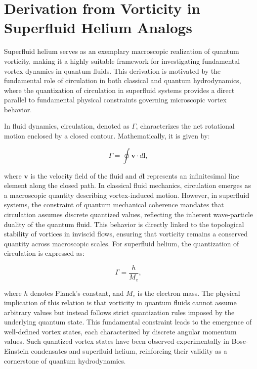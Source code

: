 \section*{Derivation from Vorticity in Superfluid Helium Analogs}

Superfluid helium serves as an exemplary macroscopic realization of quantum vorticity, making it a highly suitable framework for investigating fundamental vortex dynamics in quantum fluids. This derivation is motivated by the fundamental role of circulation in both classical and quantum hydrodynamics, where the quantization of circulation in superfluid systems provides a direct parallel to fundamental physical constraints governing microscopic vortex behavior.


In fluid dynamics, circulation, denoted as $\Gamma$, characterizes the net rotational motion enclosed by a closed contour. Mathematically, it is given by:

\begin{equation*}
\Gamma = \oint \mathbf{v} \cdot d\mathbf{l},
\label{eq:circulation_definition}
\end{equation*}

where $\mathbf{v}$ is the velocity field of the fluid and $d\mathbf{l}$ represents an infinitesimal line element along the closed path. In classical fluid mechanics, circulation emerges as a macroscopic quantity describing vortex-induced motion. However, in superfluid systems, the constraint of quantum mechanical coherence mandates that circulation assumes discrete quantized values, reflecting the inherent wave-particle duality of the quantum fluid. This behavior is directly linked to the topological stability of vortices in inviscid flows, ensuring that vorticity remains a conserved quantity across macroscopic scales. For superfluid helium, the quantization of circulation is expressed as:

\begin{equation*}
\Gamma = \frac{h}{M_e},
\label{eq:circulation}
\end{equation*}

where $h$ denotes Planck's constant, and  $ M_e $ is the electron mass. The physical implication of this relation is that vorticity in quantum fluids cannot assume arbitrary values but instead follows strict quantization rules imposed by the underlying quantum state. This fundamental constraint leads to the emergence of well-defined vortex states, each characterized by discrete angular momentum values. Such quantized vortex states have been observed experimentally in Bose-Einstein condensates and superfluid helium, reinforcing their validity as a cornerstone of quantum hydrodynamics.


